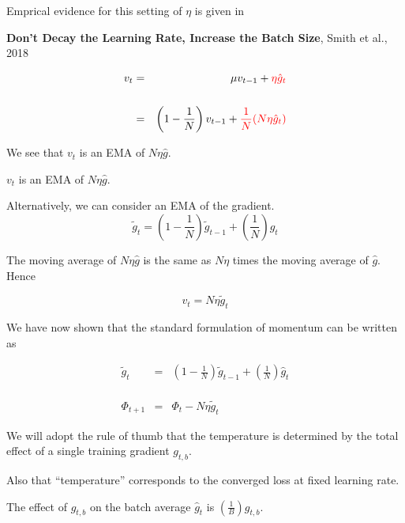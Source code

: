 {\vfill
Emprical evidence for this setting of $\eta$ is given in

\vfill
{\bf Don't Decay the Learning Rate, Increase the Batch Size}, Smith et al., 2018



\begin{eqnarray*}
v_t & = & \mu v_{t-1} + {\color{red} \eta \hat{g}_t} \\
\\
& = & \left(1-\frac{1}{N}\right) v_{t-1} + {\color{red} \frac{1}{N}(N\eta \hat{g}_t)}
\end{eqnarray*}

\vfill
We see that $v_t$ is an EMA of $N \eta \hat{g}$.


\centerline{\color{red} $v_t$ is an EMA of $N \eta \hat{g}$.}

\vfill
Alternatively, we can consider an EMA of the gradient.
{\color{red} $$\tilde{g}_t = \left(1-\frac{1}{N}\right)\tilde{g}_{t-1} + \left(\frac{1}{N}\right) \hat{g}_t$$}

\vfill
The moving average of $N\eta\hat{g}$ is the same as $N\eta$ times the moving average of $\hat{g}$.  Hence

\vfill
{\color{red} $$v_t = N \eta \tilde{g}_t$$}


We have now shown that the standard formulation of momentum can be written as

\vfill
\begin{eqnarray*}
\tilde{g}_t & = & \left(1-\frac{1}{N}\right)\tilde{g}_{t-1} + \left(\frac{1}{N}\right) \hat{g}_t \\
\\
\\
\\
\Phi_{t+1} & = &  \Phi_t - N\eta\tilde{g}_t
\end{eqnarray*}


We will adopt the rule of thumb that the temperature is determined by the total effect of a single training gradient $g_{t,b}$.


\vfill
Also that ``temperature'' corresponds to the converged loss at fixed learning rate.


The effect of $g_{t,b}$ on the batch average $\hat{g}_t$ is $\left(\frac{1}{B}\right)g_{t,b}$.

}
